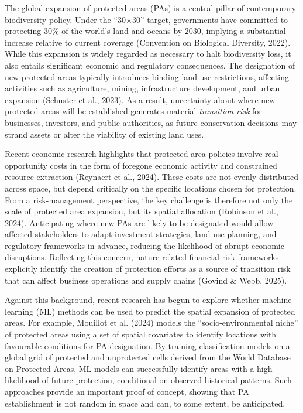 \documentclass[12pt]{article}
\theoremstyle{break} %
\begin{document}
The global expansion of protected areas (PAs) is a central pillar of contemporary biodiversity policy. Under the “30×30” target, governments have committed to protecting 30\% of the world’s land and oceans by 2030, implying a substantial increase relative to current coverage (Convention on Biological Diversity, 2022). While this expansion is widely regarded as necessary to halt biodiversity loss, it also entails significant economic and regulatory consequences. The designation of new protected areas typically introduces binding land-use restrictions, affecting activities such as agriculture, mining, infrastructure development, and urban expansion (Schuster et al., 2023). As a result, uncertainty about where new protected areas will be established generates material \emph{transition risk} for businesses, investors, and public authorities, as future conservation decisions may strand assets or alter the viability of existing land uses.

Recent economic research highlights that protected area policies involve real opportunity costs in the form of foregone economic activity and constrained resource extraction (Reynaert et al., 2024). These costs are not evenly distributed across space, but depend critically on the specific locations chosen for protection. From a risk-management perspective, the key challenge is therefore not only the scale of protected area expansion, but its spatial allocation (Robinson et al., 2024). Anticipating where new PAs are likely to be designated would allow affected stakeholders to adapt investment strategies, land-use planning, and regulatory frameworks in advance, reducing the likelihood of abrupt economic disruptions. Reflecting this concern, nature-related financial risk frameworks explicitly identify the creation of protection efforts as a source of transition risk that can affect business operations and supply chains (Govind \& Webb, 2025).

Against this background, recent research has begun to explore whether machine learning (ML) methods can be used to predict the spatial expansion of protected areas. For example, Mouillot et al. (2024) models the “socio-environmental niche” of protected areas using a set of spatial covariates to identify locations with favourable conditions for PA designation. By training classification models on a global grid of protected and unprotected cells derived from the World Database on Protected Areas, ML models can successfully identify areas with a high likelihood of future protection, conditional on observed historical patterns. Such approaches provide an important proof of concept, showing that PA establishment is not random in space and can, to some extent, be anticipated.
\end{document}
